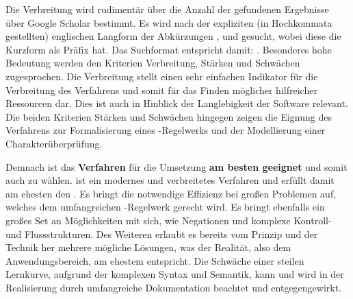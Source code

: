 Die Verbreitung wird rudimentär über die Anzahl der gefundenen Ergebnisse über Google Scholar bestimmt.
Es wird nach der expliziten (in Hochkommata gestellten) englischen Langform der Abkürzungen ,  und  gesucht, wobei diese die Kurzform als Präfix hat.
Das Suchformat entspricht damit: .
Besonderes hohe Bedeutung werden den Kriterien Verbreitung, Stärken und Schwächen zugesprochen.
Die Verbreitung stellt einen sehr einfachen Indikator für die Verbreitung des Verfahrens und somit für das Finden möglicher hilfreicher Ressourcen dar.
Dies ist auch in Hinblick der Langlebigkeit der Software relevant.
Die beiden Kriterien Stärken und Schwächen hingegen zeigen \insb die Eignung des Verfahrens zur Formalisierung eines -Regelwerks und der Modellierung einer Charakterüberprüfung.

Demnach ist das \textbf{Verfahren } für die Umsetzung \textbf{am besten geeignet} und somit auch zu wählen.
 ist ein modernes und verbreitetes Verfahren und erfüllt damit am ehesten den .
Es bringt die notwendige Effizienz bei großen Problemen auf, welches dem umfangreichen -Regelwerk gerecht wird.
Es bringt ebenfalls ein großes Set an Möglichkeiten mit sich, wie \zB Negationen und komplexe Kontroll- und Flussstrukturen.
Des Weiteren erlaubt es bereits vom Prinzip und der Technik her mehrere mögliche Lösungen, was der Realität, also dem Anwendungsbereich, am ehestem entspricht.
Die Schwäche einer steilen Lernkurve, aufgrund der komplexen Syntax und Semantik, kann und wird in der Realisierung durch umfangreiche Dokumentation beachtet und entgegengewirkt.